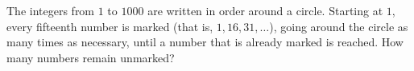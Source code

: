 The integers from $1$ to $1000$ are written in order around a circle. Starting at $1$, every fifteenth number is marked (that is, $1,16,31,\dots$), going around the circle as many times as necessary, until a number that is already marked is reached. How many numbers remain unmarked?
